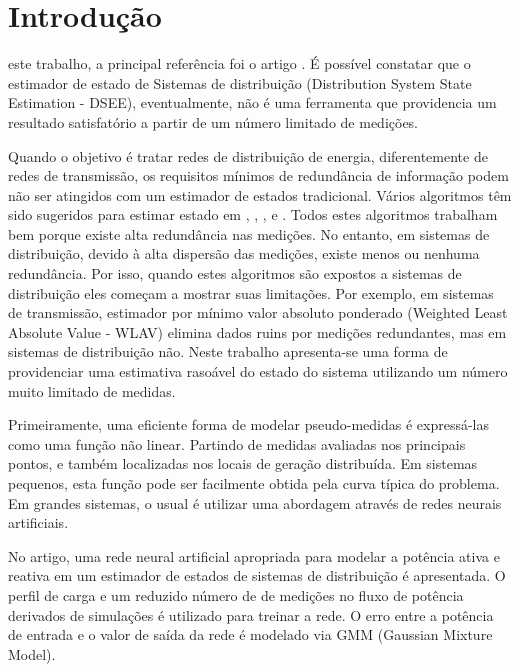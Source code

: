 \documentclass{IEEEtran}
\begin{document}
\IEEEpeerreviewmaketitle

\section{Introdução}
 este trabalho, a principal referência foi o artigo \cite{manitsas2012distribution}. É possível constatar que o estimador de estado de Sistemas de distribuição (Distribution System State Estimation - DSEE), eventualmente, não é uma ferramenta que providencia um resultado satisfatório a partir de um número limitado de medições. 

Quando o objetivo é tratar redes de distribuição de energia, diferentemente de redes de transmissão, os requisitos mínimos de redundância de informação podem não ser atingidos com um estimador de estados tradicional. Vários algoritmos têm sido sugeridos para estimar estado em \cite{schweppe1970powerI}, \cite{schweppe1970powerII}, \cite{schweppe1970powerIII}, \cite{abur2004power} e \cite{monticelli2000electric}. Todos estes algoritmos trabalham bem porque existe alta redundância nas medições. No entanto, em sistemas de distribuição, devido à alta dispersão das medições, existe menos ou nenhuma redundância. Por isso, quando estes algoritmos são expostos a sistemas de distribuição eles começam a mostrar suas limitações. Por exemplo, em sistemas de transmissão, estimador por mínimo valor absoluto ponderado (Weighted Least Absolute Value - WLAV) elimina dados ruins por medições redundantes, mas em sistemas de distribuição não. Neste trabalho apresenta-se uma forma de providenciar uma estimativa rasoável do estado do sistema utilizando um número muito limitado de medidas.

Primeiramente, uma eficiente forma de modelar pseudo-medidas é expressá-las como uma função não linear. Partindo de medidas avaliadas nos principais pontos, e também localizadas nos locais de geração distribuída. Em sistemas pequenos, esta função pode  ser facilmente obtida pela curva típica do problema. Em grandes sistemas, o usual é utilizar uma abordagem através de redes neurais artificiais.

No artigo, uma rede neural artificial apropriada para modelar a potência ativa e reativa em um estimador de estados de sistemas de distribuição é apresentada. O perfil de carga e um reduzido número de de medições no fluxo de potência derivados de simulações é utilizado para treinar a rede. O erro entre a potência de entrada e o valor de saída da rede é modelado via GMM (Gaussian Mixture Model).
\end{document}
